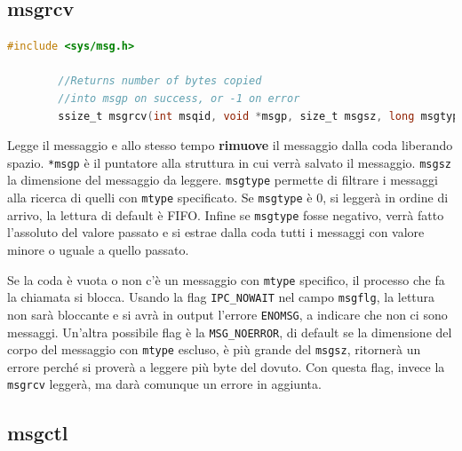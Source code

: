 \documentclass[a4paper, 12pt]{book}
\begin{document}
    \subsection{msgrcv}

    \begin{lstlisting}[language=C]
        #include <sys/msg.h>

        //Returns number of bytes copied
        //into msgp on success, or -1 on error 
        ssize_t msgrcv(int msqid, void *msgp, size_t msgsz, long msgtype, int msgflg);
    \end{lstlisting}
    Legge il messaggio e allo stesso tempo \textbf{rimuove} 
    il messaggio dalla coda liberando spazio.
    \verb|*msgp| è il puntatore alla struttura in cui 
    verrà salvato il messaggio. \verb|msgsz| la dimensione
    del messaggio da leggere. \verb|msgtype| permette di 
    filtrare i messaggi alla ricerca di quelli con \verb|mtype| 
    specificato. Se \verb|msgtype| è 0, si leggerà in ordine 
    di arrivo, la lettura di default è FIFO. Infine se
    \verb|msgtype| fosse negativo, verrà fatto l'assoluto 
    del valore passato e si estrae dalla coda tutti i 
    messaggi con valore minore o uguale a quello passato.
    
    Se la coda è vuota o non c'è un messaggio con 
    \verb|mtype| specifico, il processo che 
    fa la chiamata si blocca. Usando la flag \verb|IPC_NOWAIT|
    nel campo \verb|msgflg|, la lettura non sarà bloccante 
    e si avrà in output l'errore \verb|ENOMSG|, a indicare 
    che non ci sono messaggi. Un'altra possibile flag 
    è la \verb|MSG_NOERROR|, di default se la dimensione 
    del corpo del messaggio con \verb|mtype| escluso, è 
    più grande del \verb|msgsz|, ritornerà un errore 
    perché si proverà a leggere più byte del dovuto. Con 
    questa flag, invece la \verb|msgrcv| 
    leggerà, ma darà comunque un errore in aggiunta.
    
    \subsection{msgctl}
\end{document}
